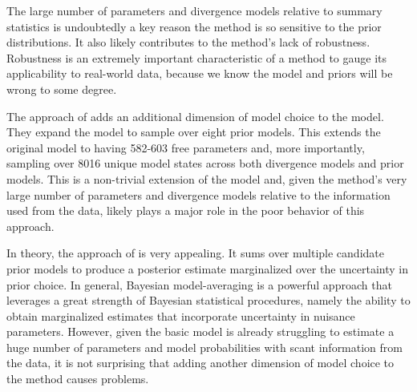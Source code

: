 The large number of parameters and divergence models relative to 
summary statistics is undoubtedly a key reason the method is so sensitive
to the prior distributions.
It also likely contributes to the method's lack of robustness.
Robustness is an extremely important characteristic of a method to gauge its
applicability to real-world data, because we know the model and priors will be
wrong to some degree.

The approach of \citet{Hickerson2013} adds an additional dimension of model
choice to the model. They expand the model to sample over eight prior models.
This extends the original model to having 582-603 free parameters and, more
importantly, sampling over 8016 unique model states across both divergence
models and prior models.
This is a non-trivial extension of the model and, given the method's very large
number of parameters and divergence models relative to the information used
from the data, likely plays a major role in the poor behavior of this approach.

In theory, the approach of \citet{Hickerson2013} is very appealing.  It sums
over multiple candidate prior models to produce a posterior estimate
marginalized over the uncertainty in prior choice.
In general, Bayesian model-averaging is a powerful approach that leverages a
great strength of Bayesian statistical procedures, namely the ability to
obtain marginalized estimates that incorporate uncertainty in nuisance
parameters.
However, given the basic \msb model is already struggling to estimate
a huge number of parameters and model probabilities with scant information
from the data, it is not surprising that adding another dimension of
model choice to the method causes problems.

